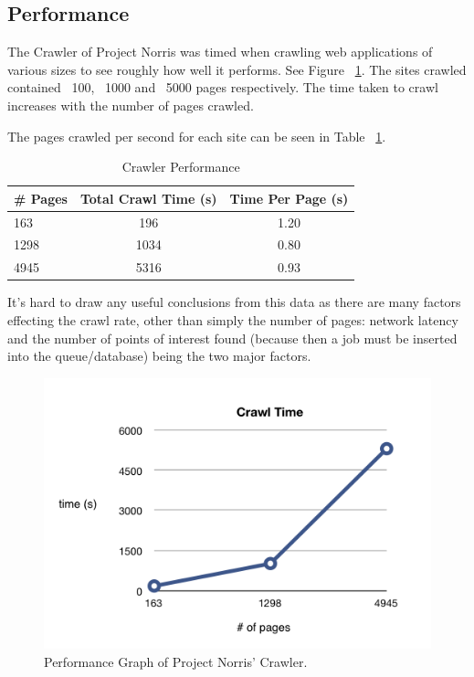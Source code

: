 \documentclass[12pt,a4paper]{article}
\begin{document}
\subsection{Performance}
The Crawler of Project Norris was timed when crawling web applications of various sizes to see roughly how well it performs.  See Figure ~\ref{fig:performance}.
The sites crawled contained ~100, ~1000 and ~5000 pages respectively.  The time taken to crawl increases with the number of pages crawled.

The pages crawled per second for each site can be seen in Table ~\ref{table:performance}.

\begin{center}
    \begin{table}
        \caption{Crawler Performance}
        \begin{center}
            \begin{tabular}{ | l | c | c | }
                \hline
                \# Pages & Total Crawl Time (s) & Time Per Page (s) \\ \hline
                163 & 196 & 1.20 \\ \hline
                1298 & 1034 & 0.80 \\ \hline
                4945 & 5316 & 0.93 \\ 
                \hline
            \end{tabular}
        \end{center}
        \label{table:performance}
    \end{table}
\end{center}

It's hard to draw any useful conclusions from this data as there are many factors effecting the crawl rate, other than simply the number of pages: network latency and the number of points of interest found (because then a job must be inserted into the queue/database) being the two major factors.

\begin{figure}[!ht]
    \begin{center}
        \includegraphics[scale=0.7]{images/crawl_performance.png}    
    \end{center}
    \caption{Performance Graph of Project Norris' Crawler.}
    \label{fig:performance}
\end{figure}
\end{document}
